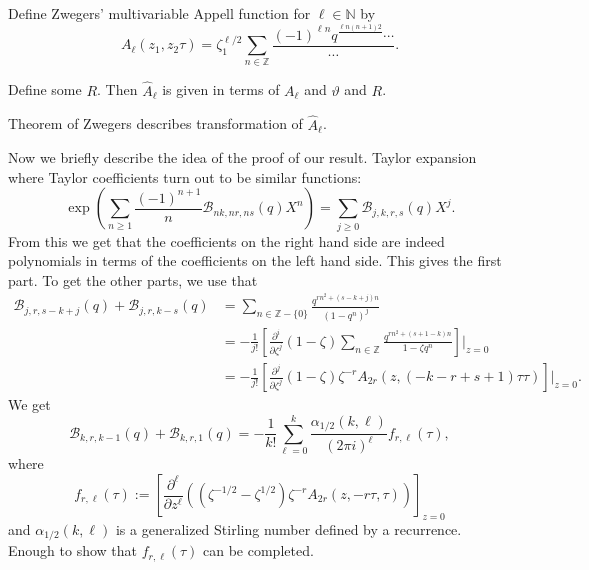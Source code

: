 \documentclass[reqno]{amsart} 
\begin{document}
Define Zwegers' multivariable Appell function for $\ell \in \mathbb{N}$ by
\begin{equation*}
  A_{\ell}(z_1, z_2 \tau)
  = \zeta_1^{\ell / 2}
  \sum_{n \in \mathbb{Z}}
  \frac{(- 1)^{\ell n} q^{\frac{\ell n(n + 1)2}{}} \dotsb}{\dotsb}.
\end{equation*}

Define some $R$.  Then $\hat{A}_{\ell}$ is given in terms of $A_{\ell}$ and $\vartheta$ and $R$.

Theorem of Zwegers describes transformation of $\hat{A}_{\ell}$.

Now we briefly describe the idea of the proof of our result.  Taylor expansion where Taylor coefficients turn out to be similar functions:
\begin{equation*}
  \exp \left( \sum_{n \geq 1}
    \frac{(- 1)^{n + 1}}{ n}
    \mathcal{B}_{n k, n r, n s}(q) X^n\right)
  = \sum_{j \geq 0}
  \mathcal{B}_{j, k, r, s}(q) X^j.
\end{equation*}
From this we get that the coefficients on the right hand side are indeed polynomials in terms of the coefficients on the left hand side.  This gives the first part.  To get the other parts, we use that
\begin{align*}
  \mathcal{B}_{j, r, s - k + j}(q) + \mathcal{B}_{j, r, k - s}(q)
  &= \sum_{n \in \mathbb{Z} - \{0\}}
    \frac{q^{r n^2 +(s - k + j) n}}{(1 - q^n)^j}
  \\
  &= - \frac{1}{j !}
    \left[ \frac{\partial^i}{\partial \zeta^j}(1 - \zeta) \sum_{n \in \mathbb{Z}}
    \frac{q^{r n^2 +(s + 1 - k) n}}{1 - \zeta q^n}\right]|_{z=0}
  \\
  &=
    - \frac{1}{j!}
    \left[ \frac{\partial^j}{\partial \zeta^j}(1 - \zeta) \zeta^{- r}
    A_{2 r}(z,(- k - r + s + 1) \tau  \tau)\right]|_{z=0}.
\end{align*}
We get
\begin{equation*}
  \mathcal{B}_{k, r, k - 1}(q) + \mathcal{B}_{k, r, 1}(q)
  = - \frac{1}{k!}
  \sum_{\ell = 0}^k
  \frac{\alpha_{1/2}(k, \ell)}{(2 \pi i)^{\ell}}
  f_{r, \ell }(\tau),
\end{equation*}
where
\begin{equation*}
  f_{r, \ell}(\tau) :=
  \left[ \frac{\partial^{\ell}}{ \partial z^{\ell}}
    \left( \left( \zeta^{-1/2} - \zeta^{1/2} \right) \zeta^{- r} A_{2 r}(z, - r \tau, \tau) \right)\right]_{z = 0}
\end{equation*}
and $\alpha_{1/2}(k, \ell)$ is a generalized Stirling number defined by a recurrence.  Enough to show that $f_{r, \ell}(\tau)$ can be completed.
\end{document}
